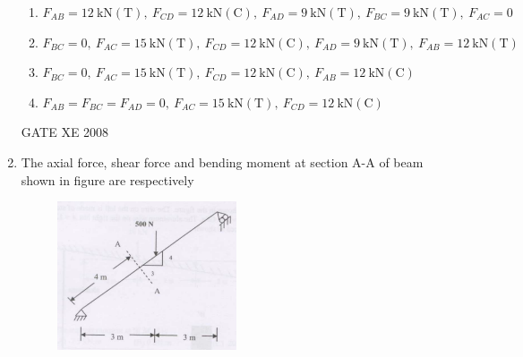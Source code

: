 \documentclass[12pt]{article}
\begin{document}
\begin{enumerate}
\begin{enumerate}

    \item  $F_{AB} = 12\ \mathrm{kN}(\mathrm{T}),\ F_{CD} = 12\ \mathrm{kN}(\mathrm{C}),\ F_{AD} = 9\ \mathrm{kN}(\mathrm{T}),\ F_{BC} = 9\ \mathrm{kN}(\mathrm{T}),\ F_{AC} = 0$  

    \item  $F_{BC} = 0,\ F_{AC} = 15\ \mathrm{kN}(\mathrm{T}),\ F_{CD} = 12\ \mathrm{kN}(\mathrm{C}),\ F_{AD} = 9\ \mathrm{kN}(\mathrm{T}),\ F_{AB} = 12\ \mathrm{kN}(\mathrm{T})$  

    \item  $F_{BC} = 0,\ F_{AC} = 15\ \mathrm{kN}(\mathrm{T}),\ F_{CD} = 12\ \mathrm{kN}(\mathrm{C}),\ F_{AB} = 12\ \mathrm{kN}(\mathrm{C})$  

    \item  $F_{AB} = F_{BC} = F_{AD} = 0,\ F_{AC} = 15\ \mathrm{kN}(\mathrm{T}),\ F_{CD} = 12\ \mathrm{kN}(\mathrm{C})$
\end{enumerate}    
    
    GATE XE 2008  

    \item The axial force, shear force and bending moment at section A-A of beam shown in figure are respectively  

    \begin{figure}[H]
    \centering
    \includegraphics[width=0.5\textwidth]{figs/ass1_f_q25.png}
    \caption{}
    \end{figure}

\begin{enumerate}
\end{enumerate}
    

\end{enumerate}
\end{document}
